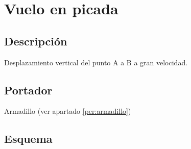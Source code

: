 	\section{Vuelo en picada} \label{hab.Vpicada}	
		\subsection{Descripción}
		Desplazamiento vertical del punto A a B a gran velocidad.
		\subsection{Portador}
		Armadillo (ver apartado \ref{per:armadillo})
		\subsection{Esquema}
